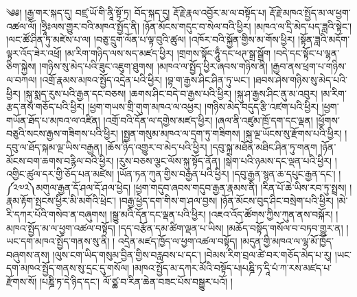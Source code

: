 \setcounter{footnote}{0} 
༄༅། །རྒྱ་གར་སྐད་དུ། བཛྲ་ཡོ་གི་ནཱི་སྟོ་ཏྲ། བོད་སྐད་དུ། རྡོ་རྗེ་རྣལ་འབྱོར་མ་ལ་བསྟོད་པ། རྡོ་རྗེ་མཁའ་སྤྱོད་མ་ལ་ཕྱག་འཚལ་ལོ། །ཧྲཱིཿལས་གྱུར་བའི་མཁའ་སྤྱོད་ནི། །ཉོན་མོངས་གདུང་བ་སེལ་བའི་ཕྱིར། །མཁའ་ལ་དྲི་མེད་པད་ཟླའི་སྟེང་། །ལང་ཚོ་ཤིན་ཏུ་མཛེས་པ་ལ། །བཅུ་དྲུག་ལོན་པ་ལྟ་བུའི་ཚུལ། །འཁོར་བའི་སྐྱོན་གྱིས་མ་གོས་ཕྱིར། །སྟོན་ཟླའི་མདོག་ལྟར་འོད་ཟེར་འཕྲོ། །མ་རིག་གཉིད་ལས་སད་མཛད་ཕྱིར། །གྲགས་སྟོང་ཧཱུྃ་དང་ཕཊ་སྒྲ་སྒྲོག །བདེ་དང་སྟོང་པ་ལྷན་ཅིག་སྐྱེས། །གཉིས་སུ་མེད་པའི་ཟུང་འཇུག་ཐུགས། །མཁའ་ལ་སྤྱོད་ཕྱིར་ཞབས་གཉིས་ནི། །རྒྱབ་ནས་ཕྲག་པ་གཉིས་ལ་བཀལ། །འགྲོ་རྣམས་མཁའ་སྤྱོད་འདྲེན་པའི་ཕྱིར། །བྷ་ག་རྒྱས་ཤིང་ཤིན་ཏུ་ཡང་། །ཐབས་ཤེས་གཉིས་སུ་མེད་པའི་ཕྱིར། །སྐུ་སྨད་རུས་པའི་རྒྱན་དང་བཅས། །ཆགས་ཤིང་བདེ་བ་རྒྱས་པའི་ཕྱིར། །སྐུ་ཤ་རྒྱས་ཤིང་ནུ་མ་འབུར། །མ་རིག་རྩད་ནས་གཅོད་པའི་ཕྱིར། །ཕྱག་གཡས་གྲི་གུག་མཁའ་ལ་འཕྱར། །གཉིས་མེད་བདུད་རྩི་འཛག་པའི་ཕྱིར། །ཕྱག་གཡོན་ཐོད་པ་མཁའ་ལ་འཛིན། །འགྲོ་བའི་དོན་ལ་དགྱེས་མཛད་ཕྱིར། །ཞལ་ནི་འཛུམ་ཁྲོ་དག་དང་ལྡན། །ཕྱོགས་བཅུའི་སངས་རྒྱས་གཟིགས་པའི་ཕྱིར། །སྤྱན་གསུམ་མཁའ་ལ་དྲག་ཏུ་གཟིགས། །སྐུ་ལྔ་ཡོངས་སུ་རྫོགས་པའི་ཕྱིར། །དབུ་ལ་ཐོད་སྐམ་ལྔ་ཡིས་བརྒྱན། །ཆོས་ཉིད་འགྱུར་བ་མེད་པའི་ཕྱིར། །དབུ་སྐྲ་མཐོན་མཐིང་ཤིན་ཏུ་གནག །ཉོན་མོངས་བག་ཆགས་བརྙིལ་བའི་ཕྱིར། །རུས་བཅས་ལྕང་ལོས་སྐུ་སྟོད་ནོན། །སྒེག་པའི་ཉམས་དང་ལྡན་པའི་ཕྱིར། །འགྱིང་ཚུལ་དར་གྱི་ཅོད་པན་མཛེས། །ཡོན་ཏན་ཀུན་གྱིས་བརྒྱན་པའི་ཕྱིར། །དབུ་རྒྱན་སྙན་ཆ་དཔུང་རྒྱན་དང་། །༼༢༧༢༽མགུལ་རྒྱན་དོ་ཤལ་དོ་ཤལ་ཕྱེད། །ཕྱག་གདུབ་ཞབས་གདུབ་རྒྱན་རྣམས་ནི། །རིན་པོ་ཆེ་ཡིས་རབ་ཏུ་སྤྲས། །རྣམ་རྟོག་སྤངས་ཕྱིར་མི་མགོའི་ཕྲེང་། །བརྒྱ་ཕྱེད་དག་གིས་ག་ཤལ་བྱས། །ཉོན་མོངས་བུད་ཤིང་བསྲེག་པའི་ཕྱིར། །མེ་རི་དཀར་པོའི་གསེབ་ན་བཞུགས། །སྒྱུ་མའི་དོན་དང་ལྡན་པའི་ཕྱིར། །འཇའ་འོད་ཚོགས་ཀྱིས་ཀུན་ནས་བསྐོར། །མཁའ་སྤྱོད་མ་ལ་ཕྱག་འཚལ་བསྟོད། །དད་བརྩོན་དམ་ཚིག་ལྡན་པ་ཡིས། །མཆོད་བསྟོད་གསོལ་བ་བཏབ་གྱུར་ན། །ཡང་དག་མཁའ་སྤྱོད་གནས་སུ་ནི། །
འདྲེན་མཛད་ཁྱོད་ལ་ཕྱག་འཚལ་བསྟོད། །མདུན་གྱི་མཁའ་ལ་ལྷ་མོ་ཁྱོད་བཞུགས་ནས། །ལུས་ངག་ཡིད་གསུམ་བྱིན་གྱིས་བརླབས་པ་དང་། །བེམས་རིག་བྲལ་ཚེ་བར་གཅོད་མེད་པ་རུ། །ཡང་དག་མཁའ་སྤྱོད་གནས་སུ་དྲང་དུ་གསོལ། །མཁའ་སྤྱོད་མ་དཀར་མོའི་བསྟོད་པ།པཎྜི་ཏ་དཱི་པཾ་ཀ་རས་མཛད་པ་རྫོགས་སོ། །པཎྜི་ཏ་དེ་ཉིད་དང་། ལོ་ཙྪ་བ་རིན་ཆེན་བཟང་པོས་བསྒྱུར་པའོ། །